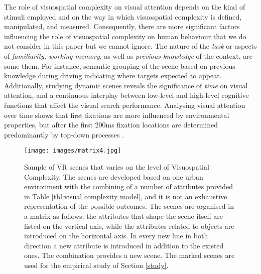 \documentclass[a4paper]{article}
\begin{document}
The role of visuospatial complexity on visual attention depends on the kind of stimuli employed and on the way in which visuospatial complexity is defined, manipulated, and measured. Consequently, there are more significant factors influencing the role of visuospatial complexity on human behaviour that we do not consider in this paper but we cannot ignore. The nature of the \emph{task} or aspects of \emph{familiarity, working memory}, as well as \emph{previous knowledge} of the context, are some them. For instance, semantic grouping of the scene based on previous knowledge during driving indicating where targets expected to appear.  Additionally, studying dynamic scenes reveals the significance of \emph{time} on visual attention, and a continuous interplay between low-level and high-level cognitive functions that affect the visual search performance. Analysing visual attention over time shows that first fixations are more influenced by environmental properties, but after the first $200$ms fixation locations are determined predominantly by top-down processes  \cite{Schutt2019}. 


\begin{figure}[t]
\texttt{[image: images/matrix4.jpg]} 
\caption{\footnotesize\sffamily Sample of  VR scenes that varies on the level of Visuospatial Complexity. The scenes are developed based on one urban environment with the combining of a number of attributes provided in Table \ref{tbl:visual complexity model}, and it is not an exhaustive representation of the possible outcomes. The scenes are organised in a matrix as follows: the attributes that shape the scene itself are listed on the vertical axis, while the attributes related to objects are introduced on the horizontal axis. In every new line in both direction a new attribute is introduced in addition to the existed ones. The combination provides a new scene. The marked scenes are used for the empirical study of Section \ref{study}.}
\label{matrix}
\end{figure}


\smallskip
\end{document}
